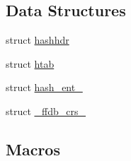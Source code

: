 \subsection*{Data Structures}
\begin{DoxyCompactItemize}
\item 
struct \mbox{\hyperlink{structhashhdr}{hashhdr}}
\item 
struct \mbox{\hyperlink{structhtab}{htab}}
\item 
struct \mbox{\hyperlink{structhash__ent__}{hash\+\_\+ent\+\_\+}}
\item 
struct \mbox{\hyperlink{struct__ffdb__crs__}{\+\_\+ffdb\+\_\+crs\+\_\+}}
\end{DoxyCompactItemize}
\subsection*{Macros}
